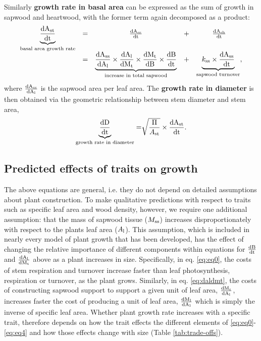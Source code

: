 \documentclass[a4paper,11pt]{article}
\begin{document}
Similarly \textbf{growth rate in basal area} can be expressed as the sum of growth in sapwood and heartwood, with the former term again decomposed as a product:
\begin{equation}\label{eq:eq3}
\begin{array}{ccccc}
\underbrace{{\frac{\rm{d} A_{\rm st}}{\rm{d} t}}}_{\text{basal area growth rate}} &=& \frac{\rm{d} A_{\rm ss}}{\rm{d} t} &+& \frac{\rm{d} A_{\rm sh}}{\rm{d} t} \\
&=& \underbrace{\frac{\rm{d} A_{\rm ss}}{\rm{d} A_{\rm l}}  \times {\frac{\ensuremath{\rm{d}}A_{\rm l}}{\ensuremath{\rm{d}}M_{\rm t}}} \times  {\frac{\ensuremath{\rm{d}}M_{\rm t}}{\ensuremath{\rm{d}}B}} \times {\frac{\ensuremath{\rm{d}}B}{\ensuremath{\rm{d}}t}}}_{\text{increase in total sapwood}} &+&  \underbrace{k_{\rm ss} \times \frac{\rm{d} A_{\rm ss}}{\rm{d} t}}_{\text{sapwood turnover}},\\
\end{array}
\end{equation}
where $\frac{\rm{d} A_{\rm ss}}{\rm{d} A_{\rm l}} $ is the  sapwood area per leaf area. The \textbf{growth rate in diameter} is then obtained via the geometric relationship between stem diameter and stem area,
\begin{equation}\label{eq:eq4}
\underbrace{\frac{\rm{d} D}{\rm{d} t}}_{\text{growth rate in diameter}} = \sqrt[]{\frac{\Pi}{A_{\rm st}}} \times {\frac{\ensuremath{\rm{d}}A_{\rm st}}{\ensuremath{\rm{d}}t}}.
\end{equation}

\subsection*{Predicted effects of traits on growth}

The above equations are general, i.e. they do not depend on detailed assumptions about plant construction. To make qualitative predictions with respect to traits such as specific leaf area and wood density, however, we require one additional assumption: that the mass of sapwood tissue ($M_{\rm ss}$) increases disproportionately with respect to the plants leaf area ($A_{\rm l}$). This assumption, which is included in nearly every model of plant growth that has been developed, has the effect of changing the relative importance of different components within equations for $\frac{\rm{d} B}{\rm{d} t}$ and $\frac{\rm{d} A_{\rm l}}{\rm{d} M_{\rm t}}$ above as a plant increases in size. Specifically, in eq. \ref{eq:eq0}, the costs of stem respiration and turnover increase faster than leaf photosynthesis, respiration or turnover, as the plant grows. Similarly, in eq. \ref{eq:daldmt}, the costs of constructing sapwood support to support a given unit of leaf area, $\frac{\rm{d} M_{\rm s}}{\rm{d} A_{\rm l}}$, increases faster the cost of producing a unit of leaf area, $\frac{\rm{d} M_{\rm l}}{\rm{d} A_{\rm l}}$ which is simply the inverse of specific leaf area. Whether plant growth rate increases with a specific trait, therefore depends on how the trait effects the different elements of \ref{eq:eq0}-\ref{eq:eq4} and how those effects change with size (Table \ref{tab:trade-offs}).
\end{document}

